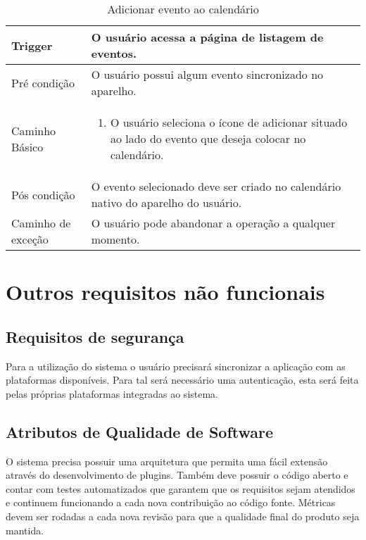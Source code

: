 \begin{table}[H]
  \begin{tabular}{ p{} | p{} }
    Trigger & O usuário acessa a página de listagem de eventos.\\
    \hline
    Pré condição & O usuário possui algum evento sincronizado no aparelho.\\
    \hline
    Caminho Básico &
    \begin{minipage}{5in}
      \vskip 4pt
      \begin{enumerate}
        \item O usuário seleciona o ícone de adicionar situado ao lado do evento que deseja colocar no calendário.
      \end{enumerate}
      \vskip 4pt
    \end{minipage} \\
    \hline
    Pós condição & O evento selecionado deve ser criado no calendário nativo do aparelho do usuário.\\
    \hline
    Caminho de exceção & O usuário pode abandonar a operação a qualquer momento.\\
    \hline
  \end{tabular}
  \caption{Adicionar evento ao calendário}
  \label{table:addevento}
\end{table}

\section{Outros requisitos não funcionais}

\subsection{Requisitos de segurança}

Para a utilização do sistema o usuário precisará sincronizar a aplicação com as plataformas disponíveis. Para tal será necessário uma autenticação, esta será feita pelas próprias plataformas integradas ao sistema.

\subsection{Atributos de Qualidade de Software}

O sistema precisa possuir uma arquitetura que permita uma fácil extensão através do desenvolvimento de plugins. Também deve possuir o código aberto e contar com testes automatizados que garantem que os requisitos sejam atendidos e continuem funcionando a cada nova contribuição ao código fonte. Métricas devem ser rodadas a cada nova revisão para que a qualidade final do produto seja mantida.
